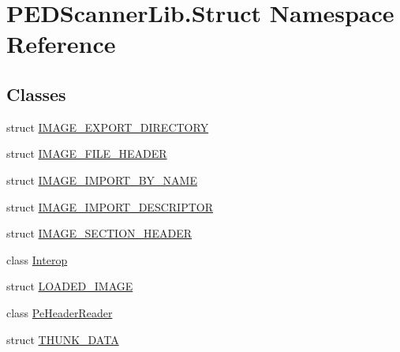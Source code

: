 \hypertarget{namespace_p_e_d_scanner_lib_1_1_struct}{}\section{P\+E\+D\+Scanner\+Lib.\+Struct Namespace Reference}
\label{namespace_p_e_d_scanner_lib_1_1_struct}
\subsection*{Classes}
\begin{DoxyCompactItemize}
\item 
struct \mbox{\hyperlink{struct_p_e_d_scanner_lib_1_1_struct_1_1_i_m_a_g_e___e_x_p_o_r_t___d_i_r_e_c_t_o_r_y}{I\+M\+A\+G\+E\+\_\+\+E\+X\+P\+O\+R\+T\+\_\+\+D\+I\+R\+E\+C\+T\+O\+RY}}
\item 
struct \mbox{\hyperlink{struct_p_e_d_scanner_lib_1_1_struct_1_1_i_m_a_g_e___f_i_l_e___h_e_a_d_e_r}{I\+M\+A\+G\+E\+\_\+\+F\+I\+L\+E\+\_\+\+H\+E\+A\+D\+ER}}
\item 
struct \mbox{\hyperlink{struct_p_e_d_scanner_lib_1_1_struct_1_1_i_m_a_g_e___i_m_p_o_r_t___b_y___n_a_m_e}{I\+M\+A\+G\+E\+\_\+\+I\+M\+P\+O\+R\+T\+\_\+\+B\+Y\+\_\+\+N\+A\+ME}}
\item 
struct \mbox{\hyperlink{struct_p_e_d_scanner_lib_1_1_struct_1_1_i_m_a_g_e___i_m_p_o_r_t___d_e_s_c_r_i_p_t_o_r}{I\+M\+A\+G\+E\+\_\+\+I\+M\+P\+O\+R\+T\+\_\+\+D\+E\+S\+C\+R\+I\+P\+T\+OR}}
\item 
struct \mbox{\hyperlink{struct_p_e_d_scanner_lib_1_1_struct_1_1_i_m_a_g_e___s_e_c_t_i_o_n___h_e_a_d_e_r}{I\+M\+A\+G\+E\+\_\+\+S\+E\+C\+T\+I\+O\+N\+\_\+\+H\+E\+A\+D\+ER}}
\item 
class \mbox{\hyperlink{class_p_e_d_scanner_lib_1_1_struct_1_1_interop}{Interop}}
\item 
struct \mbox{\hyperlink{struct_p_e_d_scanner_lib_1_1_struct_1_1_l_o_a_d_e_d___i_m_a_g_e}{L\+O\+A\+D\+E\+D\+\_\+\+I\+M\+A\+GE}}
\item 
class \mbox{\hyperlink{class_p_e_d_scanner_lib_1_1_struct_1_1_pe_header_reader}{Pe\+Header\+Reader}}
\item 
struct \mbox{\hyperlink{struct_p_e_d_scanner_lib_1_1_struct_1_1_t_h_u_n_k___d_a_t_a}{T\+H\+U\+N\+K\+\_\+\+D\+A\+TA}}
\end{DoxyCompactItemize}
